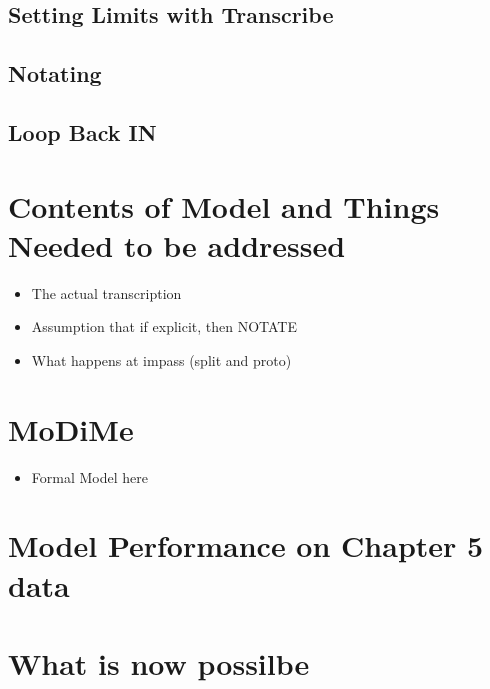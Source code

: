 \documentclass[]{book}
\providecommand{\tightlist}{%
  \setlength{\itemsep}{0pt}\setlength{\parskip}{0pt}}
\theoremstyle{definition}
\theoremstyle{definition}
\theoremstyle{definition}
\theoremstyle{remark}
\begin{document}
\hypertarget{setting-limits-with-transcribe}{%
\subsection{Setting Limits with
Transcribe}\label{setting-limits-with-transcribe}}

\hypertarget{notating}{%
\subsection{Notating}\label{notating}}

\hypertarget{loop-back-in}{%
\subsection{Loop Back IN}\label{loop-back-in}}

\hypertarget{contents-of-model-and-things-needed-to-be-addressed}{%
\section{Contents of Model and Things Needed to be
addressed}\label{contents-of-model-and-things-needed-to-be-addressed}}

\begin{itemize}
\tightlist
\item
  The actual transcription
\item
  Assumption that if explicit, then NOTATE
\item
  What happens at impass (split and proto)
\end{itemize}

\hypertarget{modime}{%
\section{MoDiMe}\label{modime}}

\begin{itemize}
\tightlist
\item
  Formal Model here
\end{itemize}

\hypertarget{model-performance-on-chapter-5-data}{%
\section{Model Performance on Chapter 5
data}\label{model-performance-on-chapter-5-data}}

\hypertarget{what-is-now-possilbe}{%
\section{What is now possilbe}\label{what-is-now-possilbe}}
\end{document}
